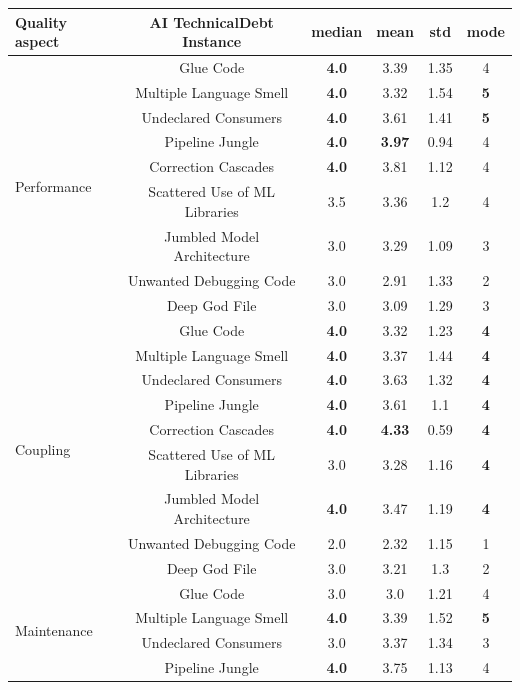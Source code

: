 \begin{table}[h!]
    \footnotesize
    \centering
    \begin{tabular}{|l|c|c|c|c|c|}
    \hline
    Quality aspect & AI TechnicalDebt Instance & median & mean & std & mode \\
    \hline
\multirow{9}{*}{Performance}
& Glue Code & \textbf{4.0} & 3.39 & 1.35 & 4  \\
& Multiple Language Smell & \textbf{4.0}& 3.32 & 1.54 & \textbf{5}  \\
& Undeclared Consumers & \textbf{4.0} & 3.61 & 1.41 & \textbf{5}  \\
& Pipeline Jungle & \textbf{4.0} & \textbf{3.97} & 0.94 & 4  \\
& Correction Cascades & \textbf{4.0} & 3.81 & 1.12 & 4  \\
& Scattered Use of ML Libraries & 3.5 & 3.36 & 1.2 & 4  \\
& Jumbled Model Architecture & 3.0 & 3.29 & 1.09 & 3  \\
& Unwanted Debugging Code & 3.0 & 2.91 & 1.33 & 2  \\
& Deep God File & 3.0 & 3.09 & 1.29 & 3  \\
    \hline
\multirow{9}{*}{Coupling}
& Glue Code & \textbf{4.0} & 3.32 & 1.23 & \textbf{4}  \\
& Multiple Language Smell & \textbf{4.0} & 3.37 & 1.44 & \textbf{4}  \\
& Undeclared Consumers & \textbf{4.0} & 3.63 & 1.32 & \textbf{4}  \\
& Pipeline Jungle & \textbf{4.0} & 3.61 & 1.1 & \textbf{4}  \\
& Correction Cascades & \textbf{4.0} & \textbf{4.33} & 0.59 & \textbf{4}  \\
& Scattered Use of ML Libraries & 3.0 & 3.28 & 1.16 &\textbf{4}  \\
& Jumbled Model Architecture & \textbf{4.0} & 3.47 & 1.19 & \textbf{4}  \\
& Unwanted Debugging Code & 2.0 & 2.32 & 1.15 & 1  \\
& Deep God File & 3.0 & 3.21 & 1.3 & 2  \\
    \hline
\multirow{9}{*}{Maintenance}
& Glue Code & 3.0 & 3.0 & 1.21 & 4  \\
& Multiple Language Smell & \textbf{4.0} & 3.39 & 1.52 & \textbf{5}  \\
& Undeclared Consumers & 3.0 & 3.37 & 1.34 & 3  \\
& Pipeline Jungle & \textbf{4.0} & 3.75 & 1.13 & 4  \\

\end{tabular}
\end{table}
